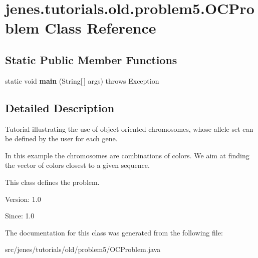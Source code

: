 \hypertarget{classjenes_1_1tutorials_1_1old_1_1problem5_1_1_o_c_problem}{
\section{jenes.tutorials.old.problem5.OCProblem Class Reference}
\label{classjenes_1_1tutorials_1_1old_1_1problem5_1_1_o_c_problem}
}
\subsection*{Static Public Member Functions}
\begin{CompactItemize}
\item 
\hypertarget{classjenes_1_1tutorials_1_1old_1_1problem5_1_1_o_c_problem_fb39fb22d5193f3dd2c7bcd0db99cee4}{
static void \textbf{main} (String\mbox{[}$\,$\mbox{]} args)  throws Exception }
\label{classjenes_1_1tutorials_1_1old_1_1problem5_1_1_o_c_problem_fb39fb22d5193f3dd2c7bcd0db99cee4}

\end{CompactItemize}


\subsection{Detailed Description}
Tutorial illustrating the use of object-oriented chromosomes, whose allele set can be defined by the user for each gene.

In this example the chromosomes are combinations of colors. We aim at finding the vector of colors closest to a given sequence.

This class defines the problem.

\begin{Desc}
\item[Version:]1.0 \end{Desc}
\begin{Desc}
\item[Since:]1.0 \end{Desc}


The documentation for this class was generated from the following file:\begin{CompactItemize}
\item 
src/jenes/tutorials/old/problem5/OCProblem.java\end{CompactItemize}
